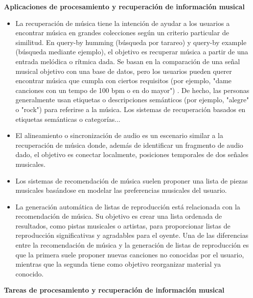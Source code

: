 \textbf{Aplicaciones de procesamiento y recuperación de información musical}
\begin{itemize}
    \item La recuperación de música tiene la intención de ayudar a los usuarios a encontrar música en grandes colecciones según un criterio particular de similitud. En query-by humming (búsqueda por tarareo) y query-by example (búsqueda mediante ejemplo), el objetivo es recuperar música a partir de una entrada melódica o rítmica dada. Se basan en la comparación de una señal musical objetivo con una base de datos, pero los usuarios pueden querer encontrar música que cumpla con ciertos requisitos (por ejemplo, "dame canciones con un tempo de 100 bpm o en do mayor") \cite{Schedl2014MusicIR}. De hecho, las personas generalmente usan etiquetas o descripciones semánticos (por ejemplo, "alegre" o "rock") para referirse a la música. Los sistemas de recuperación basados en etiquetas semánticas o categorías...
    \item El alineamiento o sincronización de audio es un escenario similar a la recuperación de música donde, además de identificar un fragmento de audio dado, el objetivo es conectar localmente, posiciones temporales de dos señales musicales.
    \item Los sistemas de recomendación de música suelen proponer una lista de piezas musicales basándose en modelar las preferencias musicales del usuario.
    \item La generación automática de listas de reproducción está relacionada con la recomendación de música. Su objetivo es crear una lista ordenada de resultados, como pistas musicales o artistas, para proporcionar listas de reproducción significativas y agradables para el oyente. Una de las diferencias entre la recomendación de música y la generación de listas de reproducción es que la primera suele proponer nuevas canciones no conocidas por el usuario, mientras que la segunda tiene como objetivo reorganizar material ya conocido.
\end{itemize}
\textbf{Tareas de procesamiento y recuperación de información musical}
